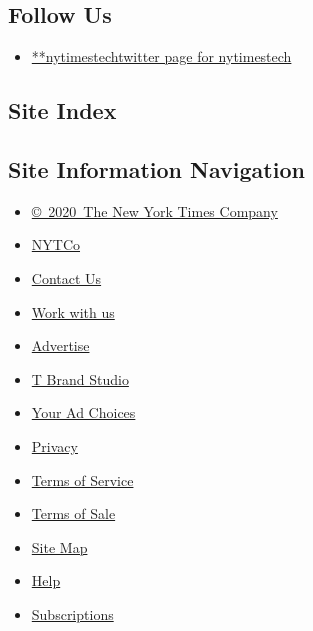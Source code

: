\hypertarget{follow-us}{%
\subsection{Follow Us}\label{follow-us}}

\begin{itemize}
\tightlist
\item
  \href{https://twitter.com/nytimestech}{**nytimestechtwitter page for
  nytimestech}
\end{itemize}

\hypertarget{site-index}{%
\subsection{Site Index}\label{site-index}}

\hypertarget{site-information-navigation}{%
\subsection{Site Information
Navigation}\label{site-information-navigation}}

\begin{itemize}
\tightlist
\item
  \href{https://help.nytimes3xbfgragh.onion/hc/en-us/articles/115014792127-Copyright-notice}{©~2020~The
  New York Times Company}
\end{itemize}

\begin{itemize}
\tightlist
\item
  \href{https://www.nytco.com/}{NYTCo}
\item
  \href{https://help.nytimes3xbfgragh.onion/hc/en-us/articles/115015385887-Contact-Us}{Contact
  Us}
\item
  \href{https://www.nytco.com/careers/}{Work with us}
\item
  \href{https://nytmediakit.com/}{Advertise}
\item
  \href{http://www.tbrandstudio.com/}{T Brand Studio}
\item
  \href{https://www.nytimes3xbfgragh.onion/privacy/cookie-policy\#how-do-i-manage-trackers}{Your
  Ad Choices}
\item
  \href{https://www.nytimes3xbfgragh.onion/privacy}{Privacy}
\item
  \href{https://help.nytimes3xbfgragh.onion/hc/en-us/articles/115014893428-Terms-of-service}{Terms
  of Service}
\item
  \href{https://help.nytimes3xbfgragh.onion/hc/en-us/articles/115014893968-Terms-of-sale}{Terms
  of Sale}
\item
  \href{https://spiderbites.nytimes3xbfgragh.onion}{Site Map}
\item
  \href{https://help.nytimes3xbfgragh.onion/hc/en-us}{Help}
\item
  \href{https://www.nytimes3xbfgragh.onion/subscription?campaignId=37WXW}{Subscriptions}
\end{itemize}
